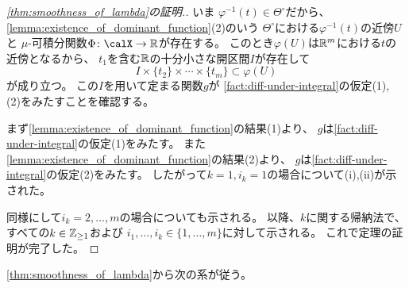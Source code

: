 \documentclass[report]{jlreq}
\begin{document}
\begin{proof}[\cref{thm:smoothness_of_lambda}の証明.]
    いま
    $\varphi^{-1}(t) \in \Theta^\circ$だから、
    \cref{lemma:existence_of_dominant_function}(2)のいう
    $\Theta^\circ$における$\varphi^{-1}(t)$の近傍$U$と
    $\mu$-可積分関数$\Phi \colon \calX \to \R$が存在する。
    このとき$\varphi(U)$は$\mathbb{R}^m$における$t$の近傍となるから、
    $t_1$を含む$\mathbb{R}$の十分小さな開区間$I$が存在して
    \begin{equation}
        I \times \{ t_2 \} \times \cdots \times \{ t_m \}
            \subset \varphi(U)
    \end{equation}
    が成り立つ。
    この$I$を用いて定まる関数$g$が
    \cref{fact:diff-under-integral}の仮定(1), (2)をみたすことを確認する。

    まず\cref{lemma:existence_of_dominant_function}の結果(1)より、
    $g$は\cref{fact:diff-under-integral}の仮定(1)をみたす。
    また\cref{lemma:existence_of_dominant_function}の結果(2)より、
    $g$は\cref{fact:diff-under-integral}の仮定(2)をみたす。
    したがって$k = 1, i_k = 1$の場合について(i),(ii)が示された。

    同様にして$i_k = 2, \dots, m$の場合についても示される。
    以降、$k$に関する帰納法で、すべての$k \in \mathbb{Z}_{\ge 1}$および
    $i_1, \dots, i_k \in \{ 1, \dots, m \}$に対して示される。
    これで定理の証明が完了した。
\end{proof}

\cref{thm:smoothness_of_lambda}から次の系が従う。


%
\end{document}
